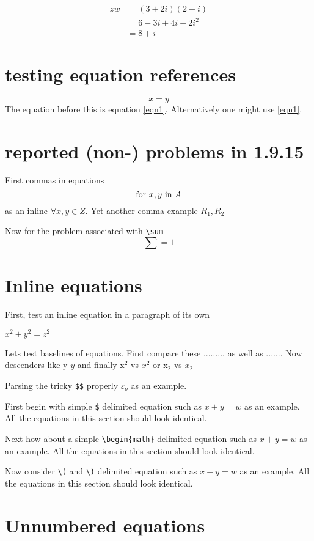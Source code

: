 \documentclass{article}
\begin{document}
\begin{align*} 
zw &=  (3+2i)(2-i)  \\ 
&=  6-3i+4i-2i^2    \\ 
&=  8+i   
\end{align*} 


\section{testing equation references}
\begin{equation}
x=y
\label{eqn1}
\end{equation}
The equation before this is equation \ref{eqn1}.  Alternatively
one might use \eqref{eqn1}.

\section{reported (non-) problems in 1.9.15}
First commas in equations
$$
\hbox{for } x,y \hbox{ in } A
$$
as an inline $\forall x, y \in Z$.  Yet another comma example
$R_1, R_2$ 

Now for the problem associated with \verb#\sum#
$$
\sum = 1
$$

\section{Inline equations}
First, test an inline equation in a paragraph of its own

$x^2+y^2=z^2$

Lets test baselines of equations.  First compare these ...$\ldots$... as
well as ...$.$...  Now descenders like y $y$ and finally x$^2$ vs $x^2$ or
x$_2$ vs $x_2$

Parsing the tricky \verb#$$# properly $\varepsilon $$_o$ as an example.

First begin with simple \verb#$# delimited equation such as
$x+y=w$ as an example.  All the equations in this section should
look identical.

Next how about a simple \verb#\begin{math}# delimited equation such as
\begin{math}x+y=w\end{math} as an example.  All the equations in this section should
look identical.

Now consider \verb#\(# and \verb#\)# delimited equation such as
\(x+y=w\) as an example.  All the equations in this section should
look identical.

\section{Unnumbered equations}
\end{document}
